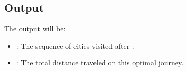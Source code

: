 \documentclass{article}
\begin{document}
\subsection*{Output}
The output will be:
\begin{itemize}
    \item {}: The sequence of cities visited after .
    \item {}: The total distance traveled on this optimal journey.
\end{itemize}
\end{document}

